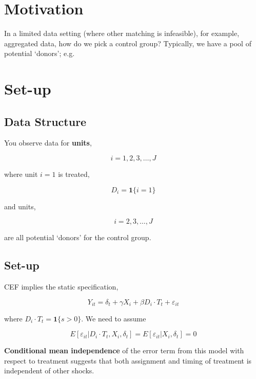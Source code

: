 \documentclass[
  letterpaper,
  DIV=11,
  numbers=noendperiod]{scrreprt}
\theoremstyle{definition}
\theoremstyle{remark}
\begin{document}
\section*{Motivation}\label{motivation}


In a limited data setting (where other matching is infeasible), for
example, aggregated data, how do we pick a control group? Typically, we
have a pool of potential `donors'; e.g.

\section*{Set-up}\label{set-up-1}


\subsection*{Data Structure}\label{data-structure}

You observe data for \textbf{units},

\[
i=1,2,3,\ldots,J
\]

where unit \(i=1\) is treated,

\[
D_i = \mathbf{1}\{i=1\}
\]

and units,

\[
i=2,3,\ldots,J
\]

are all potential `donors' for the control group.

\subsection*{Set-up}\label{set-up-2}

CEF implies the static specification,

\[
Y_{it} = \delta_t + \gamma X_i + \beta D_{i} \cdot T_t + \varepsilon_{it}
\]

where \(D_{i} \cdot T_t = \mathbf{1}\{s>0\}\). We need to assume

\[
E[\varepsilon_{it} | D_{i} \cdot T_t, X_i, \delta_t] = E[\varepsilon_{it} | X_i, \delta_t]=0
\]

\textbf{Conditional mean independence} of the error term from this model
with respect to treatment suggests that both assignment and timing of
treatment is independent of other shocks.
\end{document}
